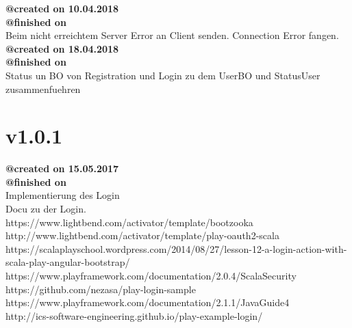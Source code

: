 \documentclass{article}
\begin{document}
\noindent \textbf{@created on 10.04.2018}\\
\textbf{@finished on }\\

\noindent Beim nicht erreichtem Server Error an Client senden. Connection Error fangen.\\

\noindent \textbf{@created on 18.04.2018}\\
\textbf{@finished on }\\

\noindent Status un BO von Registration und Login zu dem UserBO und StatusUser zusammenfuehren\\

\section{v1.0.1}

\noindent \textbf{@created on 15.05.2017}\\
\textbf{@finished on }\\

\noindent Implementierung des Login\\
Docu zu der Login.\\
https://www.lightbend.com/activator/template/bootzooka\\
http://www.lightbend.com/activator/template/play-oauth2-scala\\
https://scalaplayschool.wordpress.com/2014/08/27/lesson-12-a-login-action-with-scala-play-angular-bootstrap/\\
https://www.playframework.com/documentation/2.0.4/ScalaSecurity\\
https://github.com/nezasa/play-login-sample\\
https://www.playframework.com/documentation/2.1.1/JavaGuide4\\
http://ics-software-engineering.github.io/play-example-login/\\
        
\end{document}
